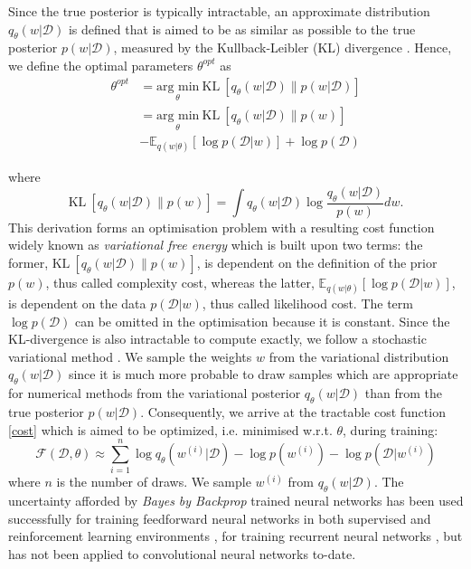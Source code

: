 Since the true posterior is typically intractable, an approximate distribution $q_{\theta}(w|\mathcal{D})$ is defined that is aimed to be as similar as possible to the true posterior $p(w|\mathcal{D})$, measured by the Kullback-Leibler (KL) divergence \cite{kullback1951information}. Hence, we define the optimal parameters $\theta^{opt}$ as
\begin{equation}
    \begin{aligned} \label{KL}
        \theta^{opt}&=\underset{\theta}{\text{arg min}}\ \text{KL} \ [q_{\theta}(w|\mathcal{D})\|p(w|\mathcal{D})] \\
        &=\underset{\theta}{\text{arg min}}\ \text{KL} \ [q_{\theta}(w|\mathcal{D})\|p(w)] \\ & -\mathbb{E}_{q(w|\theta)}[\log p(\mathcal{D}|w)]+\log p(\mathcal{D})
    \end{aligned}
\end{equation}

where
\begin{equation}
    \text{KL} \ [q_{\theta}(w|\mathcal{D})\|p(w)]= \int q_{\theta}(w|\mathcal{D})\log\frac{q_{\theta}(w|\mathcal{D})}{p(w)}dw .
\end{equation}
This derivation forms an optimisation problem with a resulting cost function widely known as \textit{variational free energy} \cite{neal1998view,yedidia2005constructing,friston2007variational} which is built upon two terms: the former, $\text{KL} \ [q_{\theta}(w|\mathcal{D})\|p(w)]$, is dependent on the definition of the prior $p(w)$, thus called complexity cost, whereas the latter, $\mathbb{E}_{q(w|\theta)}[\log p(\mathcal{D}|w)]$, is dependent on the data $p(\mathcal{D}|w)$, thus called likelihood cost. 
The term $\log p(\mathcal{D})$ can be omitted in the optimisation because it is constant.
\newline Since the KL-divergence is also intractable to compute exactly, we follow a stochastic variational method \cite{graves2011practical,blundell2015weight}.
We sample the weights $w$ from the variational distribution $q_{\theta}(w|\mathcal{D})$ since it is much more probable to draw samples which are appropriate for numerical methods from the variational posterior $q_{\theta}(w|\mathcal{D})$ than from the true posterior $p(w|\mathcal{D})$. Consequently, we arrive at the tractable cost function \eqref{cost} which is aimed to be optimized, i.e. minimised w.r.t. $\theta$, during training:
\begin{equation} \label{cost}
    \mathcal{F}(\mathcal{D}, \theta)\approx \sum_{i=1}^n \log q_{\theta}(w^{(i)}|\mathcal{D})-\log p(w^{(i)})-\log p(\mathcal{D}|w^{(i)})
\end{equation}
%
where $n$ is the number of draws.
\newline We sample $w^{(i)}$ from $q_{\theta}(w|\mathcal{D})$. The uncertainty afforded by \textit{Bayes by Backprop} trained neural networks has been used successfully for training feedforward neural networks in both supervised and reinforcement learning environments \cite{blundell2015weight,lipton2016efficient,houthooft2016curiosity}, for training recurrent neural networks \cite{fortunato2017bayesian}, but has not been applied to convolutional neural networks to-date.

